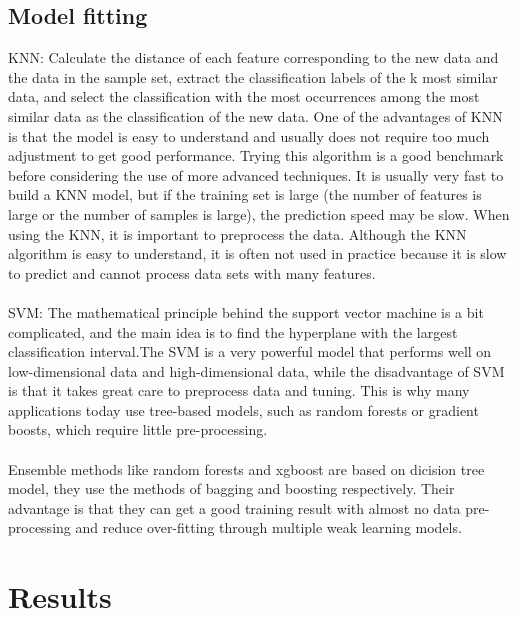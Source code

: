 \documentclass[11pt]{article}
\begin{document}
\subsection{Model fitting}
KNN: Calculate the distance of each feature corresponding to the new data and the data in the sample set, extract the classification labels of the k most similar data, and select the classification with the most occurrences among the most similar data as the classification of the new data. One of the advantages of KNN is that the model is easy to understand and usually does not require too much adjustment to get good performance. Trying this algorithm is a good benchmark before considering the use of more advanced techniques. It is usually very fast to build a KNN model,  but if the training set is large (the number of features is large or the number of samples is large), the prediction speed may be slow. When using the KNN, it is important to preprocess the data. Although the KNN algorithm is easy to understand, it is often not used in practice because it is slow to predict and cannot process data sets with many features.
\\
\\
SVM: The mathematical principle behind the support vector machine is a bit complicated, and the main idea is to find the hyperplane with the largest classification interval.The SVM is a very powerful model that performs well on low-dimensional data and high-dimensional data, while the disadvantage of SVM is that it takes great care to preprocess data and tuning. This is why many applications today use tree-based models, such as random forests or gradient boosts, which require little pre-processing. 
\\
\\
Ensemble methods like random forests and xgboost are based on dicision tree model, they use the methods of bagging and boosting respectively. Their advantage is that they can get a good training result with almost no data pre-processing and reduce over-fitting through multiple weak learning models. 



\section{Results}
\end{document}
